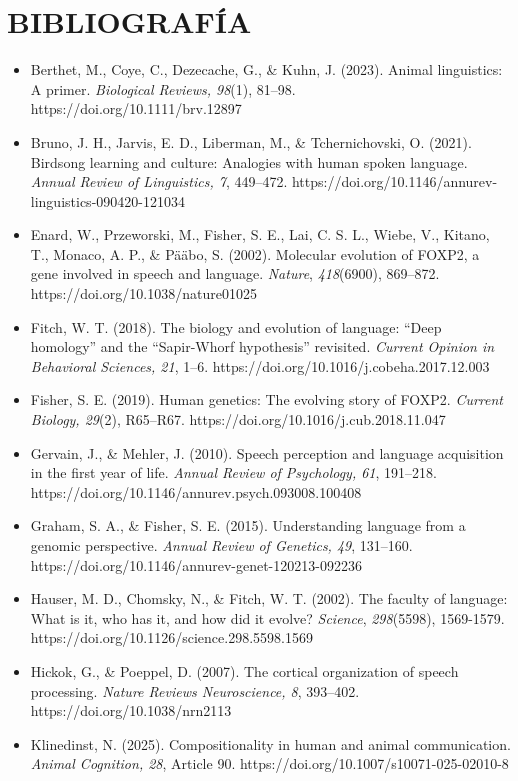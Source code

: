 \documentclass[12pt]{article}
\begin{document}
\section{BIBLIOGRAFÍA}
\begin{itemize}
    \item Berthet, M., Coye, C., Dezecache, G., \& Kuhn, J. (2023). Animal linguistics: A primer. \textit{Biological Reviews, 98}(1), 81--98. https://doi.org/10.1111/brv.12897
    \item Bruno, J. H., Jarvis, E. D., Liberman, M., \& Tchernichovski, O. (2021). Birdsong learning and culture: Analogies with human spoken language. \textit{Annual Review of Linguistics, 7}, 449--472. https://doi.org/10.1146/annurev-linguistics-090420-121034
    \item Enard, W., Przeworski, M., Fisher, S. E., Lai, C. S. L., Wiebe, V., Kitano, T., Monaco, A. P., \& Pääbo, S. (2002). Molecular evolution of FOXP2, a gene involved in speech and language. \textit{Nature}, \textit{418}(6900), 869–872. https://doi.org/10.1038/nature01025
    \item Fitch, W. T. (2018). The biology and evolution of language: “Deep homology” and the “Sapir-Whorf hypothesis” revisited. \textit{Current Opinion in Behavioral Sciences, 21}, 1--6. https://doi.org/10.1016/j.cobeha.2017.12.003
    \item Fisher, S. E. (2019). Human genetics: The evolving story of FOXP2. \textit{Current Biology, 29}(2), R65--R67. https://doi.org/10.1016/j.cub.2018.11.047
    \item Gervain, J., \& Mehler, J. (2010). Speech perception and language acquisition in the first year of life. \textit{Annual Review of Psychology, 61}, 191--218. https://doi.org/10.1146/annurev.psych.093008.100408
    \item Graham, S. A., \& Fisher, S. E. (2015). Understanding language from a genomic perspective. \textit{Annual Review of Genetics, 49}, 131--160. https://doi.org/10.1146/annurev-genet-120213-092236
    \item Hauser, M. D., Chomsky, N., \& Fitch, W. T. (2002). The faculty of language: What is it, who has it, and how did it evolve? \textit{Science}, \textit{298}(5598), 1569-1579. https://doi.org/10.1126/science.298.5598.1569
    \item Hickok, G., \& Poeppel, D. (2007). The cortical organization of speech processing. \textit{Nature Reviews Neuroscience, 8}, 393--402. https://doi.org/10.1038/nrn2113
    \item Klinedinst, N. (2025). Compositionality in human and animal communication. \textit{Animal Cognition, 28}, Article 90. https://doi.org/10.1007/s10071-025-02010-8

\end{itemize}
\end{document}
